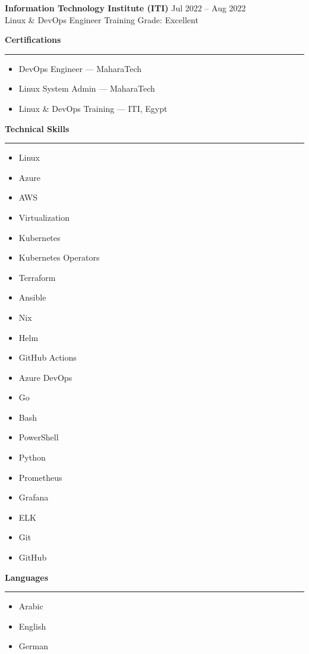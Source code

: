 \documentclass[11pt]{article}
\newcommand{\cvsection}[1]{%
  \vspace{6pt}%
  {\large\bfseries\textcolor{accent}{#1}}\\[-4pt]%
  \textcolor{accent}{\rule{\linewidth}{0.6pt}}%
  \vspace{6pt}%
}
\begin{document}
\vspace{6pt}

\textbf{Information Technology Institute (ITI)} \hfill Jul 2022 -- Aug 2022\\
Linux \& DevOps Engineer Training \hfill Grade: Excellent


\cvsection{Certifications}
\begin{multicols}{2}
	\begin{itemize}[left=0pt, label={}]
		\item DevOps Engineer — MaharaTech
		\item Linux System Admin — MaharaTech
		\item Linux \& DevOps Training — ITI, Egypt
	\end{itemize}
\end{multicols}

\cvsection{Technical Skills}
\begin{multicols}{3}
	\begin{itemize}[left=0pt, label={}]
		\item Linux
		\item Azure
		\item AWS
		\item Virtualization
		\item Kubernetes
		\item Kubernetes Operators
		\item Terraform
		\item Ansible
		\item Nix
		\item Helm
		\item GitHub Actions
		\item Azure DevOps
		\item Go
		\item Bash
		\item PowerShell
		\item Python
		\item Prometheus
		\item Grafana
		\item ELK
		\item Git
		\item GitHub
	\end{itemize}
\end{multicols}

\cvsection{Languages}
\begin{multicols}{3}
	\begin{itemize}[left=0pt, label={}]
		\item Arabic
		\item English
		\item German
	\end{itemize}
\end{multicols}

\printbibliography[heading=none]
\end{document}
